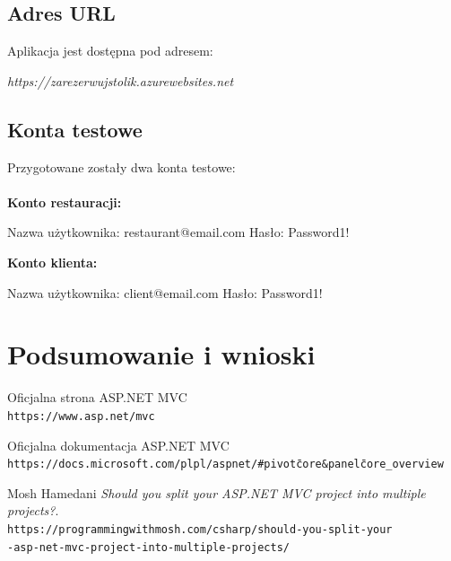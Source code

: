 \documentclass{article}
\begin{document}
\subsection{Adres URL}
Aplikacja jest dostępna pod adresem:
\begin{center}
\textit{https://zarezerwujstolik.azurewebsites.net}
\end{center}
\subsection{Konta testowe}
Przygotowane zostały dwa konta testowe:\\\\
\textbf{Konto restauracji:}
\begin{center}
Nazwa użytkownika: restaurant@email.com Hasło: Password1!
\end{center}
\textbf{Konto klienta:}
\begin{center}
Nazwa użytkownika: client@email.com Hasło: Password1!
\end{center}


\section{Podsumowanie i wnioski}


\newpage
\begin{thebibliography}{9}

Oficjalna strona ASP.NET MVC
\\\texttt{https://www.asp.net/mvc}

Oficjalna dokumentacja ASP.NET MVC
\\\texttt{https://docs.microsoft.com/pl\-pl/aspnet/\#pivot\=core\&panel\=core\_overview}

Mosh Hamedani
\textit{Should you split your ASP.NET MVC project into multiple projects?}.
\\\texttt{https://programmingwithmosh.com/csharp/should-you-split-your\\-asp-net-mvc-project-into-multiple-projects/}

\end{thebibliography}
\end{document}
